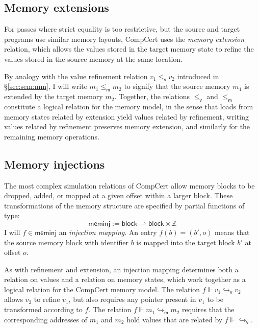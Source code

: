 \documentclass[11pt,oneside,draft]{book}
\theoremstyle{definition}
\newcommand{\kw}[1]{\ensuremath{ \mathsf{#1} }}
\newcommand{\vref}{\le_\kw{v}}   %
\newcommand{\mext}{\le_\kw{m}}   %
\begin{document}
\subsection{Memory extensions} \label{sec:memext} %

For passes where strict equality is too restrictive,
but the source and target programs
use similar memory layouts,
CompCert uses the \emph{memory extension} relation,
which allows the values
stored in the target memory state to refine
the values stored in the source memory at the same location.

By analogy with
the value refinement relation $v_1 \vref v_2$
introduced in \S\ref{sec:sem:mm},
I will write $m_1 \mext m_2$ to signify that
the source memory $m_1$ is extended by
the target memory $m_2$.
Together,
the relations $\vref$ and $\mext$
constitute a logical relation for the memory model,
in the sense that
loads from memory states related by extension
yield values related by refinement,
writing values related by refinement
preserves memory extension,
and similarly for the remaining memory operations.


\subsection{Memory injections} \label{sec:meminj} %

The most complex simulation relations of CompCert
allow memory blocks to be dropped, added, or
mapped at a given offset within a larger block.
These transformations of the memory structure
are specified by partial functions of type:
\[
  \kw{meminj} := \kw{block} \rightharpoonup \kw{block} \times \mathbb{Z}
\]
I will $f \in \kw{meminj}$
an \emph{injection mapping}.
An entry $f(b) = (b', o)$
means that the source memory block with identifier $b$
is mapped into the target block $b'$
at offset $o$.

As with refinement and extension,
an injection mapping determines both
a relation on values and
a relation on memory states,
which work together
as a logical relation for the CompCert memory model.
The relation $f \Vdash v_1 \hookrightarrow_\kw{v} v_2$
allows $v_2$ to refine $v_1$,
but also requires any pointer present in $v_1$
to be transformed according to $f$.
The relation $f \Vdash m_1 \hookrightarrow_\kw{m} m_2$
requires that the corresponding addresses of $m_1$ and $m_2$
hold values that are related by $f \Vdash {\hookrightarrow_\kw{v}}$.
\end{document}

